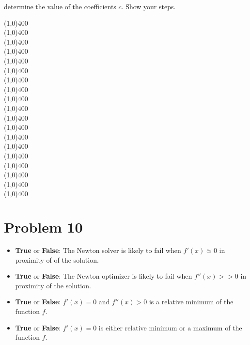 \documentclass[12pt]{article}
\def\lines{
\begin{center}
\line(1,0){400} \\
\line(1,0){400} \\
\line(1,0){400} \\
\line(1,0){400} \\
\line(1,0){400} \\
\line(1,0){400} \\
\line(1,0){400} \\
\line(1,0){400} \\
\line(1,0){400} \\
\line(1,0){400} \\
\line(1,0){400} \\
\line(1,0){400} \\
\line(1,0){400} \\
\line(1,0){400} \\
\line(1,0){400} \\
\line(1,0){400} \\
\line(1,0){400} \\
\line(1,0){400} \\
\line(1,0){400} \\
\end{center}
}
\begin{document}
\noindent determine the value of the coefficients $c$. Show your steps.

\lines

\newpage\section{Problem 10}

\begin{itemize}
\item {\bf True} or {\bf False}: The Newton solver is likely to fail when $f'(x) \simeq 0$ in proximity of of the solution.
\item {\bf True} or {\bf False}: The Newton optimizer is likely to fail when $f''(x) >> 0$ in proximity of the solution. 
\item {\bf True} or {\bf False}: $f'(x)=0$ and $f''(x)>0$ is a relative minimum of the function $f$.
\item {\bf True} or {\bf False}: $f'(x)=0$ is either relative minimum or a maximum of the function $f$.
\end{itemize}
\end{document}
